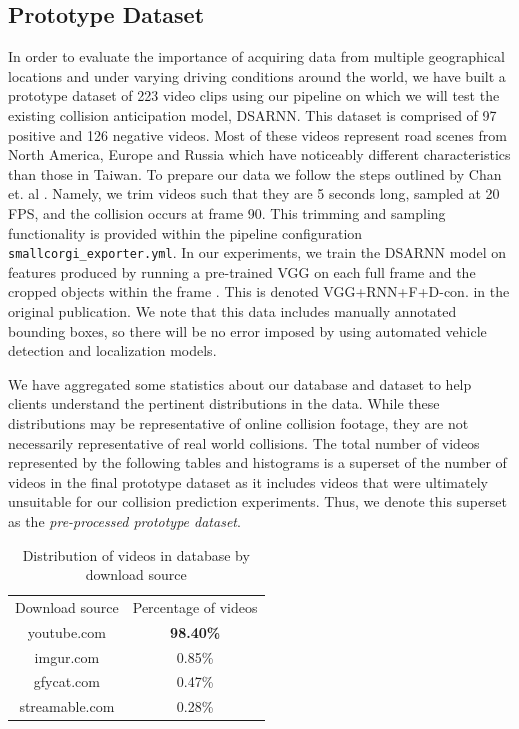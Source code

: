 \documentclass[letterpaper, 10 pt, conference]{ieeeconf}
\begin{document}
\subsection{Prototype Dataset}
\label{section-prototype-dataset}
In order to evaluate the importance of acquiring data from multiple geographical locations and under varying driving conditions around the world, we have built a prototype dataset of 223 video clips using our pipeline on which we will test the existing collision anticipation model, DSARNN. This dataset is comprised of 97 positive and 126 negative videos. Most of these videos represent road scenes from North America, Europe and Russia which have noticeably different characteristics than those in Taiwan. To prepare our data we follow the steps outlined by Chan et. al \cite{chan2016anticipating}. Namely, we trim videos such that they are 5 seconds long, sampled at 20 FPS, and the collision occurs at frame 90. This trimming and sampling functionality is provided within the pipeline configuration \texttt{smallcorgi\_exporter.yml}. In our experiments, we train the DSARNN model on features produced by running a pre-trained VGG on each full frame and the cropped objects within the frame \cite{DBLP:journals/corr/SimonyanZ14a}. This is denoted VGG+RNN+F+D-con. in the original publication. We note that this data includes manually annotated bounding boxes, so there will be no error imposed by using automated vehicle detection and localization models.

\byclass
{}\byactors
{}\byagents
{}\byduration

We have aggregated some statistics about our database and dataset to help clients understand the pertinent distributions in the data. While these distributions may be representative of online collision footage, they are not necessarily representative of real world collisions. The total number of videos represented by the following tables and histograms is a superset of the number of videos in the final prototype dataset as it includes videos that were ultimately unsuitable for our collision prediction experiments. Thus, we denote this superset as the \textit{pre-processed prototype dataset}.

\begin{table}[!h]
    \caption{Distribution of videos in database by download source}
    \label{vids-by-source}
    \begin{center}
        \begin{tabular}{|c|c|}
            \hline
            Download source & Percentage of videos \\
            youtube.com & \textbf{98.40\%} \\
            imgur.com & 0.85\% \\
            gfycat.com & 0.47\% \\
            streamable.com & 0.28\% \\
            \hline
        \end{tabular}
    \end{center}
\end{table}
\end{document}
